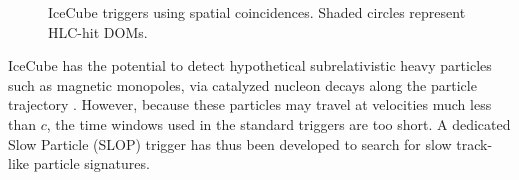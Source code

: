 \begin{figure}[ht]
  \centering {} \quad {}
  \caption{IceCube triggers using spatial coincidences.  Shaded circles
    represent HLC-hit DOMs.}
\end{figure}

IceCube has the potential to detect hypothetical subrelativistic heavy
particles such as magnetic monopoles, via catalyzed nucleon decays along
the particle trajectory \cite{IC3:monopole}.  However, because these
particles may travel at velocities much less than $c$, the time
windows used in the standard triggers are too short.  A dedicated Slow
Particle (SLOP) trigger has thus been developed to search for slow
track-like particle signatures.

